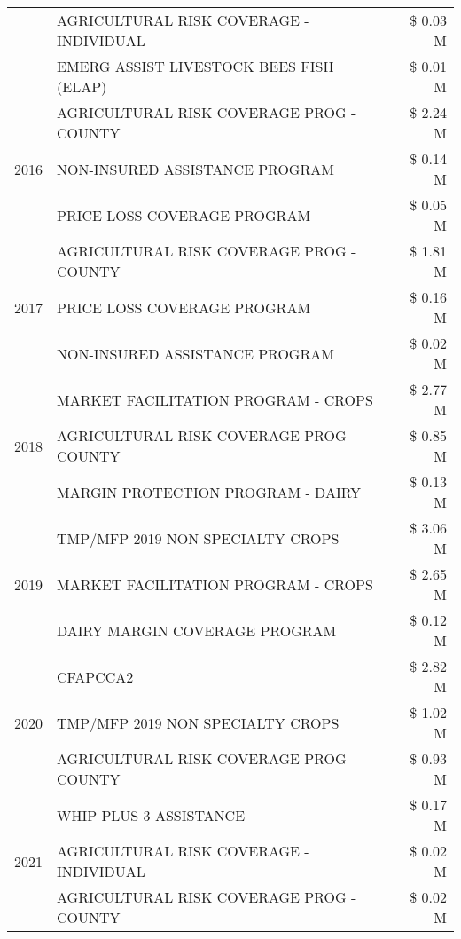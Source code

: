\begin{tabular}{llr}
 & AGRICULTURAL RISK COVERAGE - INDIVIDUAL & \$ 0.03 M \\
 & EMERG ASSIST LIVESTOCK BEES FISH (ELAP) & \$ 0.01 M \\
\cline{1-3}
\multirow[t]{3}{*}{2016} & AGRICULTURAL RISK COVERAGE PROG - COUNTY & \$ 2.24 M \\
 & NON-INSURED ASSISTANCE PROGRAM & \$ 0.14 M \\
 & PRICE LOSS COVERAGE PROGRAM & \$ 0.05 M \\
\cline{1-3}
\multirow[t]{3}{*}{2017} & AGRICULTURAL RISK COVERAGE PROG - COUNTY & \$ 1.81 M \\
 & PRICE LOSS COVERAGE PROGRAM & \$ 0.16 M \\
 & NON-INSURED ASSISTANCE PROGRAM & \$ 0.02 M \\
\cline{1-3}
\multirow[t]{3}{*}{2018} & MARKET FACILITATION PROGRAM - CROPS & \$ 2.77 M \\
 & AGRICULTURAL RISK COVERAGE PROG - COUNTY & \$ 0.85 M \\
 & MARGIN PROTECTION PROGRAM - DAIRY & \$ 0.13 M \\
\cline{1-3}
\multirow[t]{3}{*}{2019} & TMP/MFP 2019 NON SPECIALTY CROPS & \$ 3.06 M \\
 & MARKET FACILITATION PROGRAM - CROPS & \$ 2.65 M \\
 & DAIRY MARGIN COVERAGE PROGRAM & \$ 0.12 M \\
\cline{1-3}
\multirow[t]{3}{*}{2020} & CFAPCCA2 & \$ 2.82 M \\
 & TMP/MFP 2019 NON SPECIALTY CROPS & \$ 1.02 M \\
 & AGRICULTURAL RISK COVERAGE PROG - COUNTY & \$ 0.93 M \\
\cline{1-3}
\multirow[t]{3}{*}{2021} & WHIP PLUS 3 ASSISTANCE & \$ 0.17 M \\
 & AGRICULTURAL RISK COVERAGE - INDIVIDUAL & \$ 0.02 M \\
 & AGRICULTURAL RISK COVERAGE PROG - COUNTY & \$ 0.02 M \\
\cline{1-3}
\bottomrule
\end{tabular}
